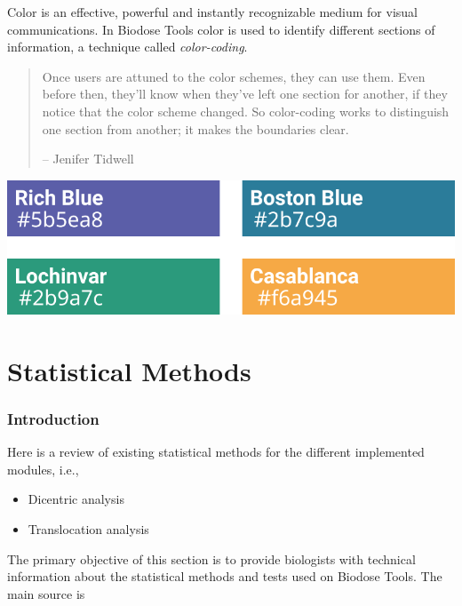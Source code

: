 \documentclass[]{scrartcl}
\providecommand{\tightlist}{%
  \setlength{\itemsep}{0pt}\setlength{\parskip}{0pt}}
\begin{document}
Color is an effective, powerful and instantly recognizable medium for visual communications. In Biodose Tools color is used to identify different sections of information, a technique called \emph{color-coding}.

\begin{quote}
Once users are attuned to the color schemes, they can use them. Even before then, they'll know when they've left one section for another, if they notice that the color scheme changed. So color-coding works to distinguish one section from another; it makes the boundaries clear.

-- Jenifer Tidwell \citep{Tidwel2010}
\end{quote}

\begin{center}\includegraphics{images/user-manual/color-coding} \end{center}

\hypertarget{part-statistical-methods}{%
\part{Statistical Methods}\label{part-statistical-methods}}

\hypertarget{stats-intro}{%
\section{Introduction}\label{stats-intro}}

Here is a review of existing statistical methods for the different implemented modules, i.e.,

\begin{itemize}
\tightlist
\item
  Dicentric analysis
\item
  Translocation analysis
\end{itemize}

The primary objective of this section is to provide biologists with technical information about the statistical methods and tests used on Biodose Tools. The main source is \citep{IAEA2001}
\end{document}
